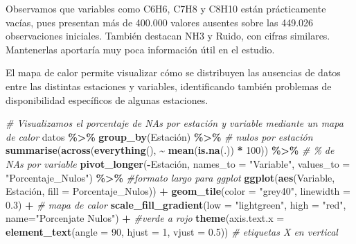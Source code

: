 \documentclass[notspecified,article,submit,oneauthor,pdftex]{Definitions/mdpi}
\newenvironment{Shaded}{\begin{snugshade}}{\end{snugshade}}
\newcommand{\AttributeTok}[1]{\textcolor[rgb]{0.13,0.29,0.53}{#1}}
\newcommand{\CommentTok}[1]{\textcolor[rgb]{0.56,0.35,0.01}{\textit{#1}}}
\newcommand{\DecValTok}[1]{\textcolor[rgb]{0.00,0.00,0.81}{#1}}
\newcommand{\FloatTok}[1]{\textcolor[rgb]{0.00,0.00,0.81}{#1}}
\newcommand{\FunctionTok}[1]{\textcolor[rgb]{0.13,0.29,0.53}{\textbf{#1}}}
\newcommand{\NormalTok}[1]{#1}
\newcommand{\SpecialCharTok}[1]{\textcolor[rgb]{0.81,0.36,0.00}{\textbf{#1}}}
\newcommand{\StringTok}[1]{\textcolor[rgb]{0.31,0.60,0.02}{#1}}
\begin{document}
Observamos que variables como C6H6, C7H8 y C8H10 están prácticamente
vacías, pues presentan más de 400.000 valores ausentes sobre las 449.026
observaciones iniciales. También destacan NH3 y Ruido, con cifras
similares. Mantenerlas aportaría muy poca información útil en el
estudio.

El mapa de calor permite visualizar cómo se distribuyen las ausencias de
datos entre las distintas estaciones y variables, identificando también
problemas de disponibilidad específicos de algunas estaciones.

\begin{Shaded}
\begin{Highlighting}[]
\CommentTok{\# Visualizamos el porcentaje de NAs por estación y variable mediante un mapa de calor}
\NormalTok{datos }\SpecialCharTok{\%\textgreater{}\%}
  \FunctionTok{group\_by}\NormalTok{(Estación) }\SpecialCharTok{\%\textgreater{}\%}                                    \CommentTok{\# nulos por estación}
  \FunctionTok{summarise}\NormalTok{(}\FunctionTok{across}\NormalTok{(}\FunctionTok{everything}\NormalTok{(), }\SpecialCharTok{\textasciitilde{}} \FunctionTok{mean}\NormalTok{(}\FunctionTok{is.na}\NormalTok{(.)) }\SpecialCharTok{*} \DecValTok{100}\NormalTok{)) }\SpecialCharTok{\%\textgreater{}\%}  \CommentTok{\# \% de NAs por variable}
  \FunctionTok{pivot\_longer}\NormalTok{(}\SpecialCharTok{{-}}\NormalTok{Estación, }\AttributeTok{names\_to =} \StringTok{"Variable"}\NormalTok{, }\AttributeTok{values\_to =} \StringTok{"Porcentaje\_Nulos"}\NormalTok{) }\SpecialCharTok{\%\textgreater{}\%}  \CommentTok{\#formato largo para ggplot}
  \FunctionTok{ggplot}\NormalTok{(}\FunctionTok{aes}\NormalTok{(Variable, Estación, }\AttributeTok{fill =}\NormalTok{ Porcentaje\_Nulos)) }\SpecialCharTok{+}
  \FunctionTok{geom\_tile}\NormalTok{(}\AttributeTok{color =} \StringTok{"grey40"}\NormalTok{, }\AttributeTok{linewidth =} \FloatTok{0.3}\NormalTok{) }\SpecialCharTok{+}            \CommentTok{\# mapa de calor}
  \FunctionTok{scale\_fill\_gradient}\NormalTok{(}\AttributeTok{low =} \StringTok{"lightgreen"}\NormalTok{, }\AttributeTok{high =} \StringTok{"red"}\NormalTok{, }\AttributeTok{name=}\StringTok{"Porcenjate Nulos"}\NormalTok{) }\SpecialCharTok{+}   \CommentTok{\#verde a rojo}
  \FunctionTok{theme}\NormalTok{(}\AttributeTok{axis.text.x =} \FunctionTok{element\_text}\NormalTok{(}\AttributeTok{angle =} \DecValTok{90}\NormalTok{, }\AttributeTok{hjust =} \DecValTok{1}\NormalTok{, }\AttributeTok{vjust =} \FloatTok{0.5}\NormalTok{))  }\CommentTok{\# etiquetas X en vertical}
\end{Highlighting}
\end{Shaded}
\end{document}
